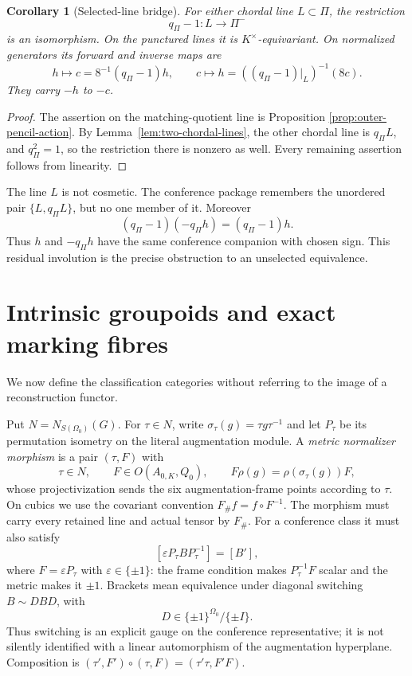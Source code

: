 \documentclass[11pt]{article}
\newtheorem{corollary}[theorem]{Corollary}
\theoremstyle{definition}
\theoremstyle{remark}
\begin{document}
\begin{corollary}[Selected-line bridge]
\label{cor:selected-line-bridge}
For either chordal line \(L\subset\Pi\), the restriction
\[
 q_\Pi-1:L\longrightarrow\Pi^-
\]
is an isomorphism.  On the punctured lines it is \(K^\times\)-equivariant.
On normalized generators its forward and inverse maps are
\[
 h\longmapsto c=8^{-1}(q_\Pi-1)h,\qquad
 c\longmapsto h=((q_\Pi-1)|_L)^{-1}(8c).
\]
They carry \(-h\) to \(-c\).
\end{corollary}

\begin{proof}
The assertion on the matching-quotient line is Proposition
\ref{prop:outer-pencil-action}.  By Lemma~\ref{lem:two-chordal-lines}, the
other chordal line is \(q_\Pi L\), and
\(q_\Pi^2=1\), so the restriction there is nonzero as well.  Every remaining
assertion follows from linearity.
\end{proof}

The line \(L\) is not cosmetic.  The conference package remembers the
unordered pair \(\{L,q_\Pi L\}\), but no one member of it.  Moreover
\[
       (q_\Pi-1)(-q_\Pi h)=(q_\Pi-1)h.
\]
Thus \(h\) and \(-q_\Pi h\) have the same conference companion with chosen sign.
This residual involution is the precise obstruction to an unselected
equivalence.

\section{Intrinsic groupoids and exact marking fibres}
\label{sec:groupoids}

We now define the classification categories without referring to the image
of a reconstruction functor.

Put \(N=N_{S(\Omega_0)}(G)\).  For \(\tau\in N\), write
\(\sigma_\tau(g)=\tau g\tau^{-1}\) and let \(P_\tau\) be its permutation
isometry on the literal augmentation module.  A \emph{metric normalizer
morphism} is a pair \((\tau,F)\) with
\[
 \tau\in N,\qquad F\in O(A_{0,K},Q_0),\qquad
 F\rho(g)=\rho(\sigma_\tau(g))F,
\]
whose projectivization sends the six augmentation-frame points according to
\(\tau\).  On cubics we use the covariant convention
\(F_\#f=f\circ F^{-1}\).  The morphism must carry every retained line and
actual tensor by \(F_\#\).  For a conference class it must also satisfy
\[
                    [\varepsilon P_\tau BP_\tau^{-1}]=[B'],
\]
where \(F=\varepsilon P_\tau\) with \(\varepsilon\in\{\pm1\}\): the frame
condition makes \(P_\tau^{-1}F\) scalar and the metric makes it \(\pm1\).
Brackets mean equivalence under diagonal switching
\(B\sim DBD\), with
\[
                  D\in\{\pm1\}^{\Omega_0}/\{\pm I\}.
\]
Thus switching
is an explicit gauge on the conference representative; it is not silently
identified with a linear automorphism of the augmentation hyperplane.
Composition is \((\tau',F')\circ(\tau,F)=(\tau'\tau,F'F)\).
\end{document}
